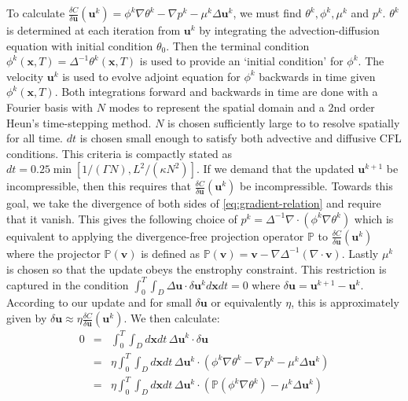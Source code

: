 To calculate $\frac{\delta C}{\delta \mathbf{u}}(\mathbf{u}^{k}) =  \phi^{k} \nabla\theta^{k} - \nabla p^{k} -\mu^{k} \Delta \mathbf{u}^{k}$, we must find $\theta^{k}, \phi^{k},\mu^{k}$ and $p^{k}$. $\theta^{k}$ is determined at each iteration from $\mathbf{u}^{k}$ by integrating the advection-diffusion equation with initial condition $\theta_0$. Then the terminal condition $\phi^{k}(\mathbf{x},T) = \Delta^{-1} \theta^{k}(\mathbf{x},T)$ is used to provide an `initial condition' for $\phi^{k}$. The velocity $\mathbf{u}^{k}$ is used to evolve adjoint equation for $\phi^{k}$ backwards in time given $\phi^{k}(\mathbf{x},T).$ Both integrations forward and backwards in time are done with a Fourier basis with $N$ modes to represent the spatial domain and a 2nd order Heun's time-stepping method. $N$ is chosen sufficiently large to to resolve spatially for all time. $dt $ is chosen small enough to satisfy both advective and diffusive CFL conditions. This criteria is compactly stated as $dt=0.25\min[1/(\Gamma N),L^2/(\kappa N^2)]$.  If we demand that the updated $\mathbf{u}^{k+1}$ be incompressible, then this requires that $\frac{\delta C}{\delta \mathbf{u}}(\mathbf{u}^{k})$ be incompressible. Towards this goal, we take the divergence of both sides of \eqref{eq:gradient-relation} and require that it vanish. This gives the following choice of $p^{k} = \Delta^{-1} \nabla \cdot (\phi^k \nabla \theta^k)$ which is equivalent to applying the divergence-free projection operator $\mathds{P}$ to $\frac{\delta C}{\delta \mathbf{u}}(\mathbf{u}^{k})$ where the projector $\mathds{P}(\mathbf{v})$ is defined as $\mathds{P}(\mathbf{v}) = \mathbf{v} - \nabla\Delta^{-1}(\nabla \cdot \mathbf{v})$. Lastly $\mu^{k}$ is chosen so that the update obeys the enstrophy constraint. This restriction is captured in the condition $\int_0^T\int_{D}\Delta \mathbf{u} \cdot \delta \mathbf{u}^k d\mathbf{x}dt= 0$ where $\delta \mathbf{u} = \mathbf{u}^{k+1} - \mathbf{u}^{k}$. According to our update and for small $\delta \mathbf{u}$ or equivalently $\eta$, this is approximately  given by $\delta \mathbf{u} \approx \eta\frac{\delta C}{\delta \mathbf{u}}(\mathbf{u}^{k}).$ We then calculate:
\begin{eqnarray}
\label{eq:linearized_constraint}
0 &=& \int_0^T\int_{D}d\mathbf{x}dt \, \Delta \mathbf{u}^{k} \cdot \delta \mathbf{u} \\
&=& \eta \int_0^T\int_{D}d\mathbf{x}dt \, \Delta \mathbf{u}^k \cdot ( \phi^k \nabla\theta^k- \nabla p^{k} -\mu^{k}\Delta \mathbf{u}^{k}) \\
&=&  \eta \int_0^T\int_{D}d\mathbf{x}dt \, \Delta \mathbf{u}^k \cdot (\mathds{P}(\phi^k \nabla\theta^k) -\mu^{k} \Delta\mathbf{u}^{k}) \\
 \end{eqnarray}
